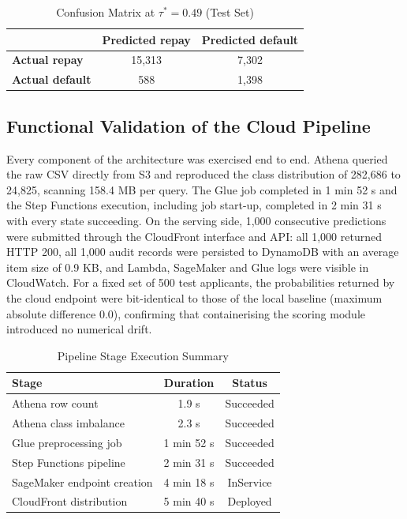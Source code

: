 \documentclass[conference]{IEEEtran}
\begin{document}
\begin{table}[htbp]
\caption{Confusion Matrix at $\tau^{*} = 0.49$ (Test Set)}
\begin{center}
\begin{tabular}{|l|c|c|}
\hline
 & \textbf{Predicted repay} & \textbf{Predicted default} \\
\hline
\textbf{Actual repay} & 15,313 & 7,302 \\
\textbf{Actual default} & 588 & 1,398 \\
\hline
\end{tabular}
\label{tab:cm}
\end{center}
\end{table}

\subsection{Functional Validation of the Cloud Pipeline}
Every component of the architecture was exercised end to end. Athena queried the raw CSV directly from S3 and reproduced the class distribution of 282,686 to 24,825, scanning 158.4 MB per query. The Glue job completed in 1 min 52 s and the Step Functions execution, including job start-up, completed in 2 min 31 s with every state succeeding. On the serving side, 1,000 consecutive predictions were submitted through the CloudFront interface and API: all 1,000 returned HTTP 200, all 1,000 audit records were persisted to DynamoDB with an average item size of 0.9 KB, and Lambda, SageMaker and Glue logs were visible in CloudWatch. For a fixed set of 500 test applicants, the probabilities returned by the cloud endpoint were bit-identical to those of the local baseline (maximum absolute difference 0.0), confirming that containerising the scoring module introduced no numerical drift.

\begin{table}[htbp]
\caption{Pipeline Stage Execution Summary}
\begin{center}
\begin{tabular}{|l|c|c|}
\hline
\textbf{Stage} & \textbf{Duration} & \textbf{Status} \\
\hline
Athena row count & 1.9 s & Succeeded \\
Athena class imbalance & 2.3 s & Succeeded \\
Glue preprocessing job & 1 min 52 s & Succeeded \\
Step Functions pipeline & 2 min 31 s & Succeeded \\
SageMaker endpoint creation & 4 min 18 s & InService \\
CloudFront distribution & 5 min 40 s & Deployed \\
\hline
\end{tabular}
\label{tab:pipeline}
\end{center}
\end{table}
\end{document}
